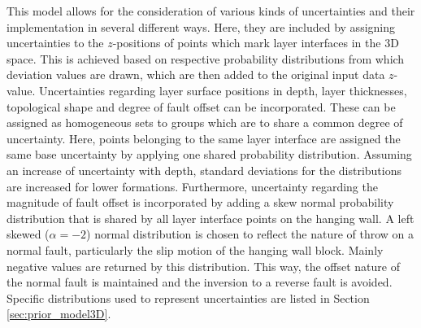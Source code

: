		This model allows for the consideration of various kinds of uncertainties and their implementation in several different ways. Here, they are included by assigning uncertainties to the $z$-positions of points which mark layer interfaces in the 3D space. This is achieved based on respective probability distributions from which deviation values are drawn, which are then added to the original input data $z$-value. Uncertainties regarding layer surface positions in depth, layer thicknesses, topological shape and degree of fault offset can be incorporated. These can be assigned as homogeneous sets to groups which are to share a common degree of uncertainty. Here, points belonging to the same layer interface are assigned the same base uncertainty by applying one shared probability distribution. Assuming an increase of uncertainty with depth, standard deviations for the distributions are increased for lower formations. Furthermore, uncertainty regarding the magnitude of fault offset is incorporated by adding a skew normal probability distribution that is shared by all layer interface points on the hanging wall. A left skewed ($\alpha=-2$) normal distribution is chosen to reflect the nature of throw on a normal fault, particularly the slip motion of the hanging wall block. Mainly negative values are returned by this distribution. This way, the offset nature of the normal fault is maintained and the inversion to a reverse fault is avoided. Specific distributions used to represent uncertainties are listed in Section \ref{sec:prior_model3D}.

